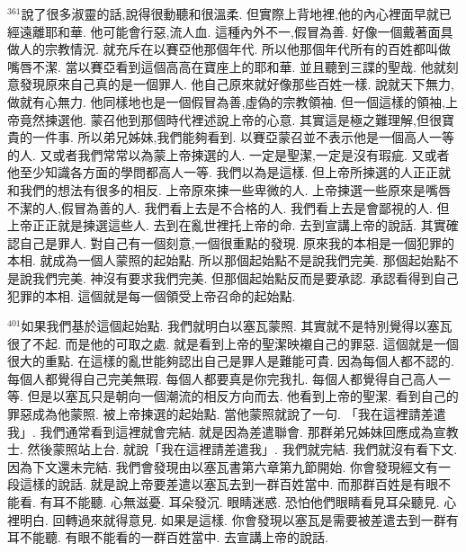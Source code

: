 \documentclass{book}
\begin{document}
$^{361}$說了很多淑靈的話,說得很動聽和很溫柔.
但實際上背地裡,他的內心裡面早就已經遠離耶和華.
他可能會行惡,流人血.
這種內外不一,假冒為善.
好像一個戴著面具做人的宗教情況.
就充斥在以賽亞他那個年代.
所以他那個年代所有的百姓都叫做嘴唇不潔.
當以賽亞看到這個高高在寶座上的耶和華.
並且聽到三諜的聖哉.
他就刻意發現原來自己真的是一個罪人.
他自己原來就好像那些百姓一樣.
說就天下無力,做就有心無力.
他同樣地也是一個假冒為善,虛偽的宗教領袖.
但一個這樣的領袖,上帝竟然揀選他.
蒙召他到那個時代裡述說上帝的心意.
其實這是極之難理解,但很寶貴的一件事.
所以弟兄姊妹,我們能夠看到.
以賽亞蒙召並不表示他是一個高人一等的人.
又或者我們常常以為蒙上帝揀選的人.
一定是聖潔,一定是沒有瑕疵.
又或者他至少知識各方面的學問都高人一等.
我們以為是這樣.
但上帝所揀選的人正正就和我們的想法有很多的相反.
上帝原來揀一些卑微的人.
上帝揀選一些原來是嘴唇不潔的人,假冒為善的人.
我們看上去是不合格的人.
我們看上去是會鄙視的人.
但上帝正正就是揀選這些人.
去到在亂世裡托上帝的命.
去到宣講上帝的說話.
其實確認自己是罪人.
對自己有一個刻意,一個很重點的發現.
原來我的本相是一個犯罪的本相.
就成為一個人蒙照的起始點.
所以那個起始點不是說我們完美.
那個起始點不是說我們完美.
神沒有要求我們完美.
但那個起始點反而是要承認.
承認看得到自己犯罪的本相.
這個就是每一個領受上帝召命的起始點.

$^{401}$如果我們基於這個起始點.
我們就明白以塞瓦蒙照.
其實就不是特別覺得以塞瓦很了不起.
而是他的可取之處.
就是看到上帝的聖潔映襯自己的罪惡.
這個就是一個很大的重點.
在這樣的亂世能夠認出自己是罪人是難能可貴.
因為每個人都不認的.
每個人都覺得自己完美無瑕.
每個人都要真是你完我扎.
每個人都覺得自己高人一等.
但是以塞瓦只是朝向一個潮流的相反方向而去.
他看到上帝的聖潔.
看到自己的罪惡成為他蒙照.
被上帝揀選的起始點.
當他蒙照就說了一句.
「我在這裡請差遣我」.
我們通常看到這裡就會完結.
就是因為差遣聯會.
那群弟兄姊妹回應成為宣教士.
然後蒙照站上台.
就說「我在這裡請差遣我」.
我們就完結.
我們就沒有看下文.
因為下文還未完結.
我們會發現由以塞瓦書第六章第九節開始.
你會發現經文有一段這樣的說話.
就是說上帝要差遣以塞瓦去到一群百姓當中.
而那群百姓是有眼不能看.
有耳不能聽.
心無滋憂.
耳朵發沉.
眼睛迷惑.
恐怕他們眼睛看見耳朵聽見.
心裡明白.
回轉過來就得意見.
如果是這樣.
你會發現以塞瓦是需要被差遣去到一群有耳不能聽.
有眼不能看的一群百姓當中.
去宣講上帝的說話.
\end{document}
